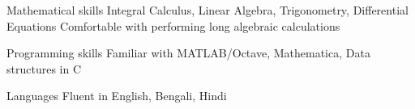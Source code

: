 

\begin{cvskills}


  
  \cvskill
	{Mathematical skills} %
	{Integral Calculus, Linear Algebra, Trigonometry, Differential Equations}
  \cvskill
	{}
	{Comfortable with performing long algebraic calculations} %

  \cvskill
    {Programming skills} %
    {Familiar with MATLAB/Octave, Mathematica, Data structures in C} %

  \cvskill
    {Languages} %
    {Fluent in English, Bengali, Hindi} %

\end{cvskills}
